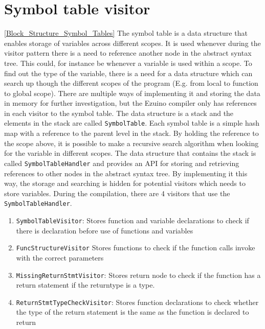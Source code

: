 \section{Symbol table visitor}
\ref{Block_Structure_Symbol_Tables}
The symbol table is a data structure that enables storage of variables across different scopes. It is used whenever during the visitor pattern there is a need to reference another node in the abstract syntax tree. This could, for instance be whenever a variable is used within a scope. To find out the type of the variable, there is a need for a data structure which can search up though the different scopes of the program (E.g. from local to function to global scope).
There are multiple ways of implementing it and storing the data in memory for further investigation, but the Ezuino compiler only has references in each visitor to the symbol table.
The data structure is a stack and the elements in the stack are called \texttt{SymbolTable}. Each symbol table is a simple hash map with a reference to the parent level in the stack. By holding the reference to the scope above, it is possible to make a recursive search algorithm when looking for the variable in different scopes.
The data structure that contains the stack is called \texttt{SymbolTableHandler} and provides an API for storing and retrieving references to other nodes in the abstract syntax tree. By implementing it this way, the storage and searching is hidden for potential visitors which needs to store variables.
During the compilation, there are 4 visitors that use the \texttt{SymbolTableHandler}.
\begin{enumerate}
    \item \texttt{SymbolTableVisitor}: Stores function and variable declarations to check if there is declaration before use of functions and variables
    \item \texttt{FuncStructureVisitor} Stores functions to check if the function calls invoke with the correct parameters
    \item \texttt{MissingReturnStmtVisitor}: Stores return node to check if the function has a return statement if the returntype is a type.
    \item \texttt{ReturnStmtTypeCheckVisitor}: Stores function declarations to check whether the type of the return statement is the same as the function is declared to return
\end{enumerate}